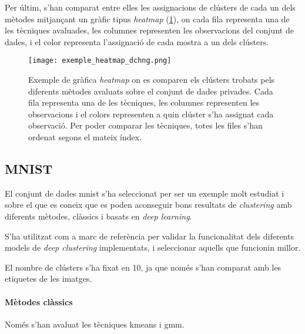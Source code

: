\documentclass[CAT,BIB]{TFUOC}%
\begin{document}
        Per últim,
        s'han comparat entre elles les assignacions de clústers de cada un dels mètodes
        mitjançant un gràfic tipus \textit{heatmap}  (\cref{f:ex_heatmap}),
        on cada fila representa una de les tècniques avaluades,
        les columnes representen les observacions del conjunt de dades,
        i el color representa l'assignació de cada mostra a un dels clústers.

        \begin{figure}
            \centering
            \texttt{[image: exemple\_heatmap\_dchng.png]}
            \caption[Exemple gràfica \textit{heatmap} de les assignacions de clústers]{
                Exemple de gràfica \textit{heatmap}
                on es comparen els clústers trobats pels diferents mètodes
                avaluats sobre el conjunt de dades \gls{privades}.
                Cada fila representa una de les tècniques,
                les columnes representen les observacions
                i el colors representen a quin clúster s'ha assignat cada observació.
                Per poder comparar les tècniques,
                totes les files s'han ordenat segons el mateix índex.
            }
            \label{f:ex_heatmap}
        \end{figure}


        \subsection{MNIST}
        \label{s:mnist}

            El conjunt de dades \gls{mnist}
            s'ha seleccionat per ser un exemple molt estudiat
            i sobre el que es coneix que
            es poden aconseguir bons resultats de \textit{clustering}
            amb diferents mètodes, clàssics i basats en \textit{deep learning}.

            S'ha utilitzat com a marc de referència
            per validar la funcionalitat
            dels diferents models de \textit{deep clustering} implementats,
            i seleccionar aquells que funcionin millor.

            El nombre de clústers s'ha fixat en 10,
            ja que només s'han comparat amb les etiquetes de les imatges.

            \paragraph{Mètodes clàssics}
                Només s'han avaluat les tècniques \gls{kmeans} i \gls{gmm}.
\end{document}
